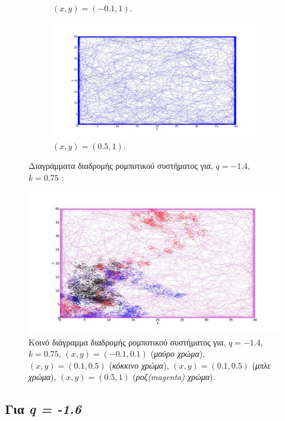 \begin{figure}[ht]
\begin{subfigure}[b]{0.55\textwidth}
		\caption{$(x,y) = (-0.1,1)$.}
		\label{f:g96}
	\end{subfigure}
	\hfill
	\begin{subfigure}[b]{0.55\textwidth}
		\centering
		\includegraphics[width=\textwidth]{LateX images/log/xy/g4-1.4}
		\caption{$(x,y) = (0.5,1)$.}
		\label{f:g97}
	\end{subfigure}
	\hfill
	\caption{Διαγράμματα διαδρομής ρομποτικού συστήματος για, $q = -1.4$, $k = 0.75$ :}
\end{figure}

\begin{figure}[ht]
	\centering
	\includegraphics[width=1\linewidth]{LateX images/log/xy/g2}
	\caption{Κοινό διάγραμμα διαδρομής ρομποτικού συστήματος για, $q = -1.4$, $k = 0.75$, $(x,y) = (-0.1,0.1)$ (\emph{μαύρο χρώμα}), $(x,y) = (0.1,0.5)$ (\emph{κόκκινο χρώμα}), $(x,y) = (0.1,0.5)$ (\emph{μπλε χρώμα}), $(x,y) = (0.5,1)$ (\emph{ροζ(magenta) χρώμα}).}
	\label{f:g98}	
\end{figure}

\clearpage

\subsection{Για \emph{q = -1.6}}

